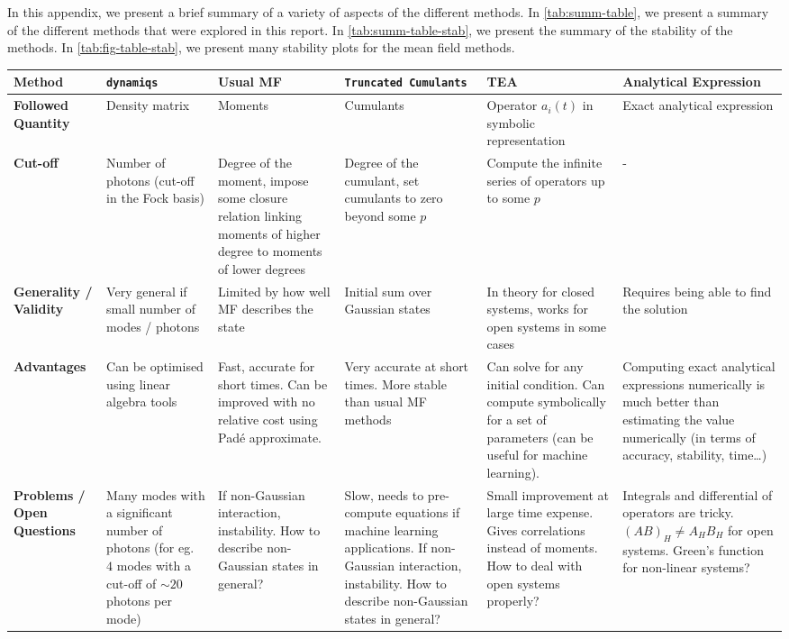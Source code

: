 In this appendix, we present a brief summary of a variety of aspects of the different methods. In \autoref{tab:summ-table}, we present a summary of the different methods that were explored in this report. In \autoref{tab:summ-table-stab}, we present the summary of the stability of the methods. In \autoref{tab:fig-table-stab}, we present many stability plots for the mean field methods.

\begin{landscape}
\begin{center}
    \begin{table}[h!]
    \centering
    \begin{tabular}{|p{3.5cm}|p{4cm}|p{4cm}|p{4cm}|p{4cm}|p{4cm}|}
        \hline
        \textbf{Method} & \texttt{dynamiqs}~\cite{dynamiqs} & \textbf{Usual MF} & \texttt{Truncated Cumulants} & \textbf{TEA} & \textbf{Analytical Expression} \\
        \hline
        \textbf{Followed Quantity} & Density matrix & Moments & Cumulants & Operator $a_i(t)$ in symbolic representation & Exact analytical expression \\
        \hline
        \textbf{Cut-off} & Number of photons (cut-off in the Fock basis) & Degree of the moment, impose some closure relation linking moments of higher degree to moments of lower degrees & Degree of the cumulant, set cumulants to zero beyond some $p$ & Compute the infinite series of operators up to some $p$ & - \\
        \hline
        \textbf{Generality / Validity} & Very general if small number of modes / photons & Limited by how well MF describes the state & Initial sum over Gaussian states & In theory for closed systems, works for open systems in some cases & Requires being able to find the solution \\
        \hline
        \textbf{Advantages} & Can be optimised using linear algebra tools & Fast, accurate for short times. Can be improved with no relative cost using Padé approximate. & Very accurate at short times. More stable than usual MF methods & Can solve for any initial condition. Can compute symbolically for a set of parameters (can be useful for machine learning). & Computing exact analytical expressions numerically is much better than estimating the value numerically (in terms of accuracy, stability, time\ldots)\\
        \hline
        \textbf{Problems / Open Questions} & Many modes with a significant number of photons (for eg.\@~$4$ modes with a cut-off of $\sim 20$ photons per mode) & If non-Gaussian interaction, instability. How to describe non-Gaussian states in general? & Slow, needs to pre-compute equations if machine learning applications. If non-Gaussian interaction, instability. How to describe non-Gaussian states in general? & Small improvement at large time expense. Gives correlations instead of moments. How to deal with open systems properly? & Integrals and differential of operators are tricky. $(A B)_H \neq A_H B_H$ for open systems. Green's function for non-linear systems?\\

\end{tabular}
\end{table}
\end{center}
\end{landscape}
